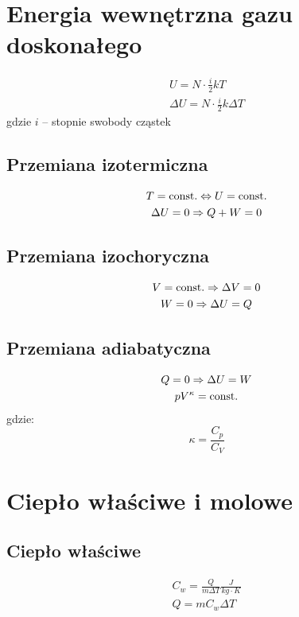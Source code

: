 \section{Energia wewnętrzna gazu doskonałego}
\begin{gather*}
  U = N \cdot\frac i 2 kT\\
  \Delta U = N \cdot \frac i 2 k \Delta T
\end{gather*}
gdzie $i$ -- stopnie swobody cząstek

\subsection{Przemiana izotermiczna}
\begin{gather*}
  T = \operatorname{const.} \Leftrightarrow U = \operatorname{const.}\\
  \Delta U = 0 \Rightarrow Q + W = 0
\end{gather*}

\subsection{Przemiana izochoryczna}
\begin{gather*}
  V = \operatorname{const.} \Rightarrow \Delta V = 0\\
  W = 0 \Rightarrow \Delta U = Q
\end{gather*}

\subsection{Przemiana adiabatyczna}
\begin{gather*}
  Q = 0 \Rightarrow \Delta U = W\\
  p V^\kappa = \operatorname{const.}
\end{gather*}
gdzie:
\begin{equation*}
  \kappa = \frac{C_p}{C_V}
\end{equation*}

\section{Ciepło właściwe i molowe }

\subsection{Ciepło właściwe}
\begin{gather*}
  C_w = \frac{Q}{m \Delta T} \unit{\frac{J}{kg \cdot K}}\\
  Q = m C_w \Delta T
\end{gather*}

